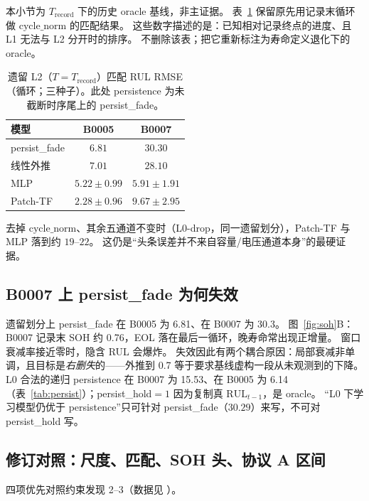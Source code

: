 \documentclass[UTF8,a4paper,12pt]{ctexart}
\begin{document}
本小节为 $T_{\mathrm{record}}$ 下的历史 oracle 基线，非主证据。
表~\ref{tab:l2legacy} 保留原先用记录末循环做 $\mathrm{cycle\_norm}$ 的匹配结果。
这些数字描述的是：已知相对记录终点的进度、且 L1 无法与 L2 分开时的排序。
不删除该表；把它重新标注为寿命定义退化下的 oracle。

\begin{table}[htbp]
\centering
\caption{遗留 L2（$T=T_{\mathrm{record}}$）匹配 RUL RMSE（循环；三种子）。此处 persistence 为未截断时序尾上的 persist\_fade。}
\label{tab:l2legacy}
\begin{tabular}{@{}lcc@{}}
\toprule
模型 & B0005 & B0007 \\
\midrule
persist\_fade & $6.81$ & $30.30$ \\
线性外推 & $7.01$ & $28.10$ \\
MLP & $5.22\pm0.99$ & $\mathbf{5.91\pm1.91}$ \\
Patch-TF & $\mathbf{2.28\pm0.96}$ & $9.67\pm2.95$ \\
\bottomrule
\end{tabular}
\end{table}

去掉 $\mathrm{cycle\_norm}$、其余五通道不变时（L0-drop，同一遗留划分），Patch-TF 与 MLP 落到约 $19$--$22$。
这仍是``头条误差并不来自容量/电压通道本身''的最硬证据。

\subsection{B0007 上 persist\_fade 为何失效}
\label{sec:b0007}

遗留划分上 persist\_fade 在 B0005 为 6.81、在 B0007 为 30.3。
图~\ref{fig:soh}B：B0007 记录末 SOH 约 0.76，EOL 落在最后一循环，晚寿命常出现正增量。
窗口衰减率接近零时，隐含 RUL 会爆炸。
失效因此有两个耦合原因：局部衰减非单调，且目标是\emph{右删失}的——外推到 0.7 等于要求基线虚构一段从未观测到的下降。
L0 合法的递归 persistence 在 B0007 为 15.53、在 B0005 为 6.14（表~\ref{tab:persist}）；persist\_hold$=1$ 因为复制真 $\mathrm{RUL}_{t-1}$，是 oracle。
``L0 下学习模型仍优于 persistence''只可针对 persist\_fade（$30.29$）来写，不可对 persist\_hold 写。

\subsection{修订对照：尺度、匹配、SOH 头、协议 A 区间}
\label{sec:controls}

四项优先对照约束发现 2--3（数据见 ）。
\end{document}
